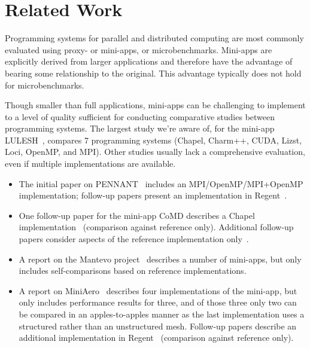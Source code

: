 \section{Related Work}
\label{sec:related-work}

Programming systems for parallel and distributed computing are most
commonly evaluated using proxy- or mini-apps, or
micro\-benchmarks. Mini-apps are explicitly derived from larger
applications and therefore have the advantage of bearing some
relationship to the original. This advantage typically does not hold
for microbenchmarks.

Though smaller than full applications, mini-apps can be challenging to
implement to a level of quality sufficient for conducting comparative
studies between programming systems. The largest study we're aware of,
for the mini-app LULESH~\cite{LULESH13}, compares 7 programming
systems (Chapel, Charm++, CUDA, Lizst, Loci, OpenMP, and MPI). Other
studies usually lack a comprehensive evaluation, even if multiple
implementations are available.

\begin{itemize}

\item
The initial paper on PENNANT~\cite{PENNANT} includes an MPI/OpenMP/MPI+OpenMP
implementation; follow-up papers present an implementation in
Regent~\cite{Regent15, ControlReplication17, LegionTracing18}.

\item
One follow-up paper for the mini-app CoMD describes a Chapel
implementation~\cite{CoMDChapel16} (comparison against reference
only). Additional follow-up papers consider aspects of the reference
implementation only~\cite{CoMDLoadImbalance17,
  CoMDThreadedModels14}.

\item
A report on the Mantevo project~\cite{Mantevo09} describes a number of
mini-apps, but only includes self-comparisons based on reference
implementations.

\item
A report on MiniAero~\cite{SandiaReportManyTaskRuntimes15} describes
four implementations of the mini-app, but only includes performance
results for three, and of those three only two can be compared in an
apples-to-apples manner as the last implementation uses a structured
rather than an unstructured mesh. Follow-up papers describe an
additional implementation in Regent~\cite{Regent15,
  ControlReplication17, LegionTracing18} (comparison against reference
only).

\end{itemize}

